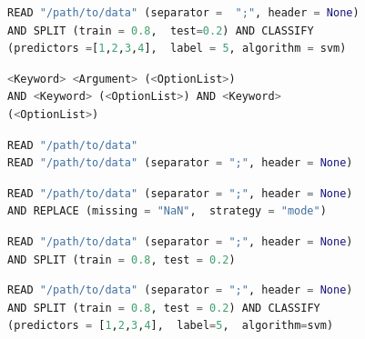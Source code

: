 \clearpage


\begin{lstlisting}[language=python,  caption={Example of a SML Query Performing Classification.}, label={lst:sml-ex-1}]
READ "/path/to/data" (separator =  ";", header = None) 
AND SPLIT (train = 0.8,  test=0.2) AND CLASSIFY 
(predictors =[1,2,3,4],  label = 5, algorithm = svm) 
\end{lstlisting}


\begin{lstlisting}[language=python,  caption={Here the example \(Query\) in listing \ref{lst:sml-ex-1} is defined in BNF format.}, label={lst:SML:BNFComp}]
<Keyword> <Argument> (<OptionList>) 
AND <Keyword> (<OptionList>) AND <Keyword>
(<OptionList>) 
\end{lstlisting}

\begin{lstlisting}[language=python,  caption={Examples using the \(READ\) \(Keyword\) in SML.}, label={lst:SML:READ}]
READ "/path/to/data" 
READ "/path/to/data" (separator = ";", header = None) 
\end{lstlisting}


\begin{lstlisting}[language=python,  caption={An example utilizing the \(REPLACE\) \(Keyword\) in SML.}, label={lst:SML:REPLACE}]
READ "/path/to/data" (separator = ";", header = None) 
AND REPLACE (missing = "NaN",  strategy = "mode")
\end{lstlisting}

\begin{lstlisting}[language=python,  caption={Example using the \(SPLIT\) \(Keyword\) in SML.}, label={lst:SML:SPLIT}]
READ "/path/to/data" (separator = ";", header = None) 
AND SPLIT (train = 0.8, test = 0.2)
\end{lstlisting}

\begin{lstlisting}[language=python,  caption={Example using the \(CLASSIFY\) \(Keyword\) in SML.  Here we read in data and create training and testing datasets using the \(READ\) and \(SPLIT\) \(Keyword\)s respectively. We then use \(CLASSIFY\) \(Keyword\) with the first 4 columns as features and the 5th column to perform classification using a support vector machine.}, label={lst:SML:CLASSIFY}]
READ "/path/to/data" (separator = ";", header = None) 
AND SPLIT (train = 0.8, test = 0.2) AND CLASSIFY
(predictors = [1,2,3,4],  label=5,  algorithm=svm)
\end{lstlisting}

